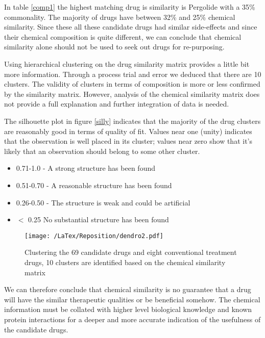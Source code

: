 \documentclass[preprint,12pt]{elsarticle}
\begin{document}
In table \ref{comp1}  the highest matching drug is similarity is  Pergolide with a 35\% commonality. The majority of drugs have between 32\% and 25\% chemical similarity. Since these all these candidate drugs had similar side-effects and since their chemical composition is quite different, we can conclude that chemical similarity alone should not be used to seek out drugs for re-purposing.

Using hierarchical clustering on the drug similarity matrix provides a little bit more information. Through a process trial and error we deduced that there are 10 clusters. The validity of clusters in terms of composition is more or less confirmed by the similarity matrix. However, analysis of the chemical similarity matrix does not provide a full explanation and further integration of data is needed. 

The silhouette plot in figure \ref{silly} indicates that the majority of the drug clusters are reasonably good in terms of quality of fit. Values near one (unity) indicates  that the observation is well placed in its cluster; values near zero show that it's likely that an observation should belong to some other cluster. 

\begin{itemize}
\item 0.71-1.0  - A strong structure has been found
\item 0.51-0.70 - A reasonable structure has been found
\item 0.26-0.50 - The structure is weak and could be artificial
\item $<$ 0.25 No substantial structure has been found
\end{itemize}

\begin{figure*}[h]
  \begin{center}
	 \texttt{[image: /LaTex/Reposition/dendro2.pdf]} %
  \end{center}
 \caption{Clustering the 69 candidate drugs and eight conventional treatment drugs, 10 clusters are identified based on the chemical similarity matrix}
\label{dendro}
\end{figure*}

We can therefore conclude that chemical similarity is no guarantee that a drug will have the similar therapeutic qualities or be beneficial somehow. The chemical information must be collated with higher level biological knowledge and known protein interactions for a deeper and more accurate indication of the usefulness of the candidate drugs.  
\end{document}
